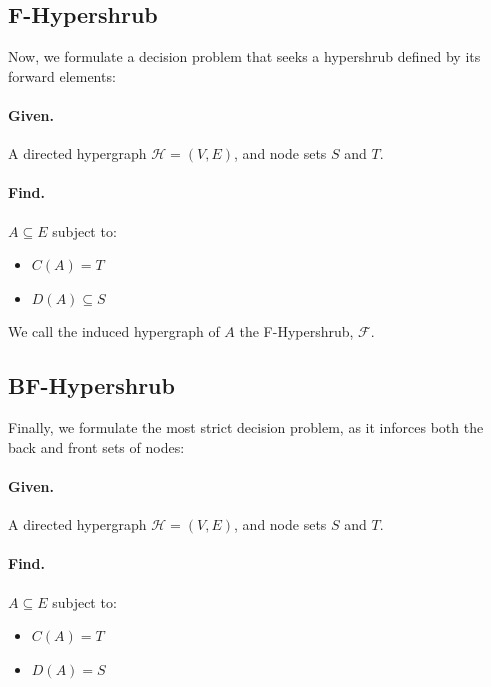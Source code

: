 \documentclass[12pt,twoside]{reedthesis}
\theoremstyle{definition}
\begin{document}
\subsection{F-Hypershrub}
Now, we formulate a decision problem that seeks a hypershrub defined by its forward elements:

\bigbreak

\hfill\begin{minipage}{\dimexpr\textwidth-2cm}
\paragraph{Given.}A directed hypergraph $\mathcal{H}=(V,E)$, and node sets $S$ and $T$.
\paragraph{Find.}$A \subseteq E$ subject to:
\begin{itemize}
  \item{$C(A) = T$}
  \item{$D(A) \subseteq S$}
\end{itemize}
\xdef\tpd{\the\prevdepth}
\end{minipage}
\bigbreak
We call the induced hypergraph of $A$ the F-Hypershrub, $\mathcal{F}$.\par

\subsection{BF-Hypershrub}
Finally, we formulate the most strict decision problem, as it inforces both the back and front sets of nodes:

\bigbreak

\hfill\begin{minipage}{\dimexpr\textwidth-2cm}
\paragraph{Given.}A directed hypergraph $\mathcal{H}=(V,E)$, and node sets $S$ and $T$.
\paragraph{Find.}$A \subseteq E$ subject to:
\begin{itemize}
  \item{$C(A) = T$}
  \item{$D(A) = S$}
\end{itemize}
\xdef\tpd{\the\prevdepth}
\end{minipage}
\bigbreak
\end{document}
